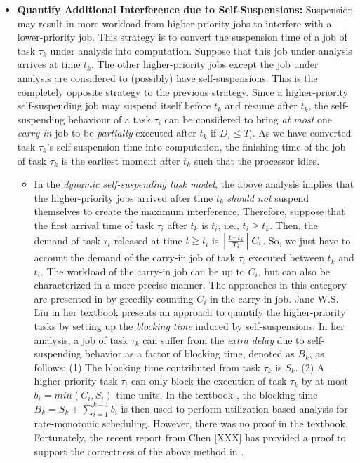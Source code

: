 \begin{itemize}
\item {\bf Quantify Additional Interference due to Self-Suspensions:} Suspension may result in more workload from higher-priority jobs to interfere with a lower-priority job. This strategy is to convert the suspension time of a job of task $\tau_k$ under analysis into computation. Suppose that this job under analysis arrives at time $t_k$. The other higher-priority jobs except the job under analysis are considered to (possibly) have self-suspensions. This is the completely opposite strategy to the previous strategy. Since a higher-priority self-suspending job may suspend itself before $t_k$ and resume after $t_k$, the self-suspending behaviour of a task $\tau_i$ can be considered to bring \emph{at most} one \emph{carry-in} job to be \emph{partially} executed after $t_k$ if $D_i \leq T_i$. As we have converted task $\tau_k$'s self-suspension time into computation, the finishing time of the job of task $\tau_k$ is the earliest moment after $t_k$ such that the processor idles. 
\begin{itemize}
\item In the \emph{dynamic self-suspending task model}, the above analysis implies that the higher-priority jobs arrived after time $t_k$ \emph{should not} suspend themselves to create the maximum interference. Therefore, suppose that the first arrival time of task $\tau_i$ after $t_k$ is $t_i$, i.e., $t_i \geq t_k$. Then, the demand of task $\tau_i$ released at time $t \geq t_i$ is $\left\lceil{\frac{t-t_i}{T_i} }\right\rceil C_i$. So, we just have to account the demand of the carry-in job of task $\tau_i$ executed between $t_k$ and $t_i$. The workload of the carry-in job can be up to $C_i$, but can also be characterized in a more precise manner. The approaches in this category are presented in \cite{huangpass:dac2015,LiuChen:rtss2014} by greedily counting $C_i$ in the carry-in job. 
Jane W.S. Liu in her textbook \cite[Page 164-165]{Liu:2000:RS:518501} presents an approach to quantify the higher-priority tasks by setting up the \emph{blocking time} induced by self-suspensions. In her analysis, a job of task $\tau_k$ can suffer from the \emph{extra delay} due to self-suspending behavior as a factor of blocking time, denoted as $B_k$, as follows: (1) The blocking time contributed from task $\tau_k$ is $S_k$. (2) A higher-priority task $\tau_i$ can only block the execution of task $\tau_k$ by at most $b_i=min(C_i, S_i)$ time units. In the textbook \cite{Liu:2000:RS:518501}, the blocking time $B_k=S_k+\sum_{i=1}^{k-1} b_i$ is then used to perform utilization-based analysis for rate-monotonic scheduling. However, there was no proof in the textbook. Fortunately, the recent report from Chen [XXX] has provided a proof to support the correctness of the above method in \cite{Liu:2000:RS:518501}.


\end{itemize}
\end{itemize}
